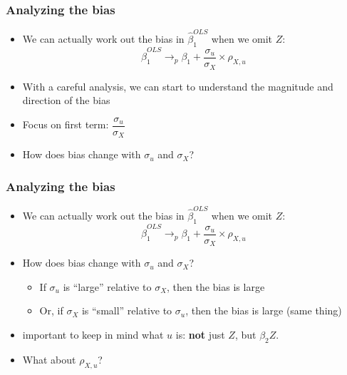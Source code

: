 \documentclass[aspectratio=169]{beamer}
\begin{document}
\begin{frame}
    \frametitle{Analyzing the bias}
    \begin{itemize}
        \item We can actually work out the bias in $\hat{\beta}_1^{OLS}$ when we omit $Z$:
        $$
            \hat{\beta}_1^{OLS} \rightarrow_p \beta_1 + \dfrac{\sigma_u}{\sigma_X} \times \rho_{X,u}
        $$
        \item With a careful analysis, we can start to understand the magnitude and direction of the bias
        \item Focus on first term: $\dfrac{\sigma_u}{\sigma_X}$
        \item How does bias change with $\sigma_u$ and $\sigma_X$?
    \end{itemize}
\end{frame}

\begin{frame}
    \frametitle{Analyzing the bias}
    \begin{itemize}
        \item We can actually work out the bias in $\hat{\beta}_1^{OLS}$ when we omit $Z$:
        $$
            \hat{\beta}_1^{OLS} \rightarrow_p \beta_1 + \dfrac{\sigma_u}{\sigma_X} \times \rho_{X,u}
        $$
        \item How does bias change with $\sigma_u$ and $\sigma_X$?
        \begin{itemize}
            \item If $\sigma_u$ is ``large'' relative to $\sigma_X$, then the bias is large
            \item Or, if $\sigma_X$ is ``small'' relative to $\sigma_u$, then the bias is large (same thing)
        \end{itemize}
        \item important to keep in mind what $u$ is: \textbf{not} just $Z$, but $\beta_2 Z$.
        \item What about $\rho_{X,u}$?
    \end{itemize}
\end{frame}
\end{document}
